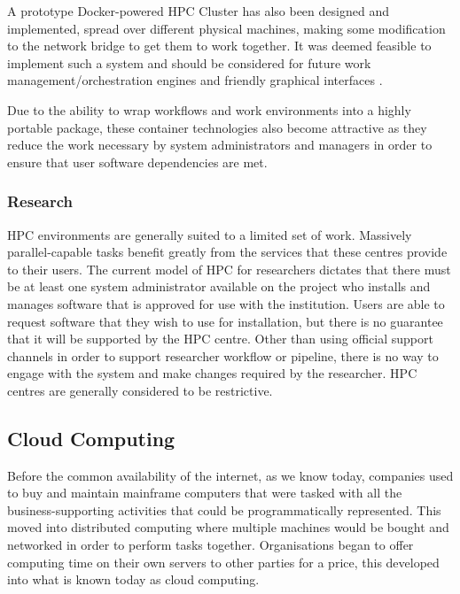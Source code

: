 A prototype Docker-powered HPC Cluster has also been designed and implemented, spread over different physical machines, making some modification to the network bridge to get them to work together. It was deemed feasible to implement such a system and should be considered for future work management/orchestration engines and friendly graphical interfaces \parencite{yu2015building}.

Due to the ability to wrap workflows and work environments into a highly portable package, these container technologies also become attractive as they reduce the work necessary by system administrators and managers in order to ensure that user software dependencies are met.

\subsubsection{Research}

HPC environments are generally suited to a limited set of work. Massively parallel-capable tasks benefit greatly from the services that these centres provide to their users. The current model of HPC for researchers dictates that there must be at least one system administrator available on the project who installs and manages software that is approved for use with the institution. Users are able to request software that they wish to use for installation, but there is no guarantee that it will be supported by the HPC centre. Other than using official support channels in order to support researcher workflow or pipeline, there is no way to engage with the system and make changes required by the researcher. HPC centres are generally considered to be restrictive.


\subsection{Cloud Computing}

Before the common availability of the internet, as we know today, companies used to buy and maintain mainframe computers that were tasked with all the business-supporting activities that could be programmatically represented. This moved into distributed computing where multiple machines would be bought and networked in order to perform tasks together. Organisations began to offer computing time on their own servers to other parties for a price, this developed into what is known today as cloud computing. 

